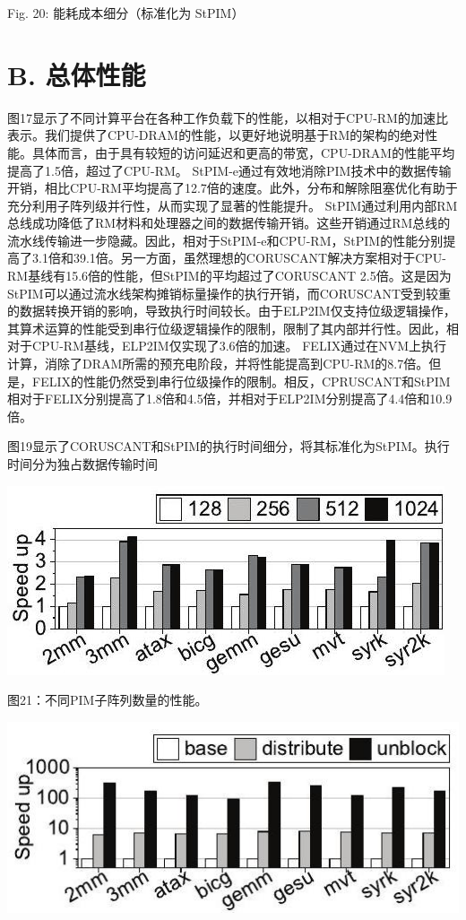 \documentclass[10pt]{article}
\begin{document}
Fig. 20: 能耗成本细分（标准化为 StPIM）

\section*{B. 总体性能}

图17显示了不同计算平台在各种工作负载下的性能，以相对于CPU-RM的加速比表示。我们提供了CPU-DRAM的性能，以更好地说明基于RM的架构的绝对性能。具体而言，由于具有较短的访问延迟和更高的带宽，CPU-DRAM的性能平均提高了1.5倍，超过了CPU-RM。 StPIM-e通过有效地消除PIM技术中的数据传输开销，相比CPU-RM平均提高了12.7倍的速度。此外，分布和解除阻塞优化有助于充分利用子阵列级并行性，从而实现了显著的性能提升。 StPIM通过利用内部RM总线成功降低了RM材料和处理器之间的数据传输开销。这些开销通过RM总线的流水线传输进一步隐藏。因此，相对于StPIM-e和CPU-RM，StPIM的性能分别提高了3.1倍和39.1倍。另一方面，虽然理想的CORUSCANT解决方案相对于CPU-RM基线有15.6倍的性能，但StPIM的平均超过了CORUSCANT 2.5倍。这是因为StPIM可以通过流水线架构摊销标量操作的执行开销，而CORUSCANT受到较重的数据转换开销的影响，导致执行时间较长。由于ELP2IM仅支持位级逻辑操作，其算术运算的性能受到串行位级逻辑操作的限制，限制了其内部并行性。因此，相对于CPU-RM基线，ELP2IM仅实现了3.6倍的加速。 FELIX通过在NVM上执行计算，消除了DRAM所需的预充电阶段，并将性能提高到CPU-RM的8.7倍。但是，FELIX的性能仍然受到串行位级操作的限制。相反，CPRUSCANT和StPIM相对于FELIX分别提高了1.8倍和4.5倍，并相对于ELP2IM分别提高了4.4倍和10.9倍。

图19显示了CORUSCANT和StPIM的执行时间细分，将其标准化为StPIM。执行时间分为独占数据传输时间

\begin{center}
\includegraphics[max width=\textwidth]{2024_05_12_abeba8a85da5b5ec4c7bg-11}
\end{center}

图21：不同PIM子阵列数量的性能。

\begin{center}
\includegraphics[max width=\textwidth]{2024_05_12_abeba8a85da5b5ec4c7bg-11(1)}
\end{center}
\end{document}
